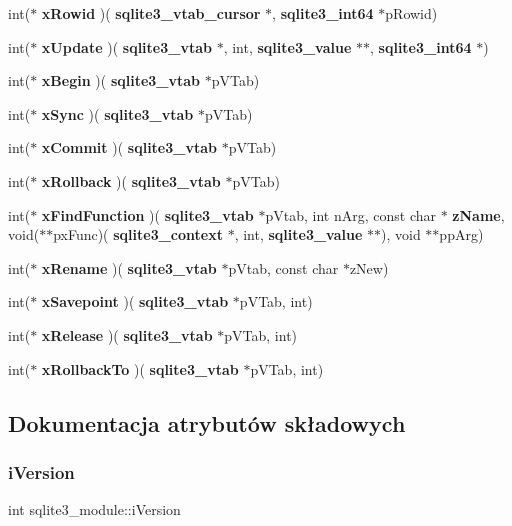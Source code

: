 \begin{DoxyCompactItemize}
\item 
int($\ast$ \textbf{ x\+Rowid} )(\textbf{ sqlite3\+\_\+vtab\+\_\+cursor} $\ast$, \textbf{ sqlite3\+\_\+int64} $\ast$p\+Rowid)
\item 
int($\ast$ \textbf{ x\+Update} )(\textbf{ sqlite3\+\_\+vtab} $\ast$, int, \textbf{ sqlite3\+\_\+value} $\ast$$\ast$, \textbf{ sqlite3\+\_\+int64} $\ast$)
\item 
int($\ast$ \textbf{ x\+Begin} )(\textbf{ sqlite3\+\_\+vtab} $\ast$p\+V\+Tab)
\item 
int($\ast$ \textbf{ x\+Sync} )(\textbf{ sqlite3\+\_\+vtab} $\ast$p\+V\+Tab)
\item 
int($\ast$ \textbf{ x\+Commit} )(\textbf{ sqlite3\+\_\+vtab} $\ast$p\+V\+Tab)
\item 
int($\ast$ \textbf{ x\+Rollback} )(\textbf{ sqlite3\+\_\+vtab} $\ast$p\+V\+Tab)
\item 
int($\ast$ \textbf{ x\+Find\+Function} )(\textbf{ sqlite3\+\_\+vtab} $\ast$p\+Vtab, int n\+Arg, const char $\ast$\textbf{ z\+Name}, void($\ast$$\ast$px\+Func)(\textbf{ sqlite3\+\_\+context} $\ast$, int, \textbf{ sqlite3\+\_\+value} $\ast$$\ast$), void $\ast$$\ast$pp\+Arg)
\item 
int($\ast$ \textbf{ x\+Rename} )(\textbf{ sqlite3\+\_\+vtab} $\ast$p\+Vtab, const char $\ast$z\+New)
\item 
int($\ast$ \textbf{ x\+Savepoint} )(\textbf{ sqlite3\+\_\+vtab} $\ast$p\+V\+Tab, int)
\item 
int($\ast$ \textbf{ x\+Release} )(\textbf{ sqlite3\+\_\+vtab} $\ast$p\+V\+Tab, int)
\item 
int($\ast$ \textbf{ x\+Rollback\+To} )(\textbf{ sqlite3\+\_\+vtab} $\ast$p\+V\+Tab, int)
\end{DoxyCompactItemize}


\subsection{Dokumentacja atrybutów składowych}
\mbox{\label{structsqlite3__module_a42b11d080dc205aea43581b18f925afe}} 
\subsubsection{iVersion}
{\footnotesize\ttfamily int sqlite3\+\_\+module\+::i\+Version}

\mbox{\label{structsqlite3__module_af3ea97df2b110da6ceb4797222e6d86f}} 
